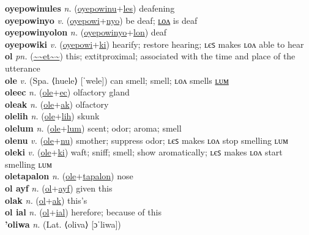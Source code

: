 \textbf{oyepowinules} \textit{n.} (\hyperref[oyepowinu]{oyepowinu}+\hyperref[les]{les})
deafening \label{oyepowinules} \\
\textbf{oyepowinyo} \textit{v.} (\hyperref[oyepowi]{oyepowi}+\hyperref[nyo]{nyo})
be deaf; \hyperref[oyepowinyolon]{ʟᴏᴧ} is deaf \label{oyepowinyo} \\
\textbf{oyepowinyolon} \textit{n.} (\hyperref[oyepowinyo]{oyepowinyo}+\hyperref[lon]{lon})
deaf \label{oyepowinyolon} \\
\textbf{oyepowiki} \textit{v.} (\hyperref[oyepowi]{oyepowi}+\hyperref[ki]{ki})
hearify; restore hearing; ʟєꜱ makes ʟᴏᴧ able to hear \label{oyepowiki} \\
\textbf{ol} \textit{pn.} (\hyperref[et]{\~{}\~{}et\~{}\~{}})
this; 	extit{proximal}; associated with the time and place of the utterance \label{ol} \\
\textbf{ole} \textit{v.} (Spa. ⟨huele⟩ [ˈwele])
can smell; smell; ʟᴏᴧ smells \hyperref[olelum]{ʟᴜᴍ} \label{ole} \\
\textbf{oleec} \textit{n.} (\hyperref[ole]{ole}+\hyperref[ec]{ec})
olfactory gland \label{oleec} \\
\textbf{oleak} \textit{n.} (\hyperref[ole]{ole}+\hyperref[ak]{ak})
olfactory \label{oleak} \\
\textbf{olelih} \textit{n.} (\hyperref[ole]{ole}+\hyperref[lih]{lih})
skunk \label{olelih} \\
\textbf{olelum} \textit{n.} (\hyperref[ole]{ole}+\hyperref[lum]{lum})
scent; odor; aroma; smell \label{olelum} \\
\textbf{olenu} \textit{v.} (\hyperref[ole]{ole}+\hyperref[nu]{nu})
smother; suppress odor; ʟєꜱ makes ʟᴏᴧ stop smelling ʟᴜᴍ \label{olenu} \\
\textbf{oleki} \textit{v.} (\hyperref[ole]{ole}+\hyperref[ki]{ki})
waft; sniff; smell; show aromatically; ʟєꜱ makes ʟᴏᴧ start smelling ʟᴜᴍ \label{oleki} \\
\textbf{oletapalon} \textit{n.} (\hyperref[ole]{ole}+\hyperref[tapalon]{tapalon})
nose \label{oletapalon} \\
\textbf{ol ayf} \textit{n.} (\hyperref[ol]{ol}+\hyperref[yf]{ayf})
given this \label{ol ayf} \\
\textbf{olak} \textit{n.} (\hyperref[ol]{ol}+\hyperref[ak]{ak})
this's \label{olak} \\
\textbf{ol ial} \textit{n.} (\hyperref[ol]{ol}+\hyperref[al]{ial})
herefore; because of this \label{ol ial} \\
\textbf{'oliwa} \textit{n.} (Lat. ⟨oliva⟩ [ɔˈliwa])
